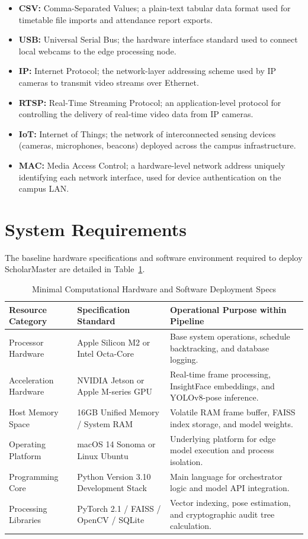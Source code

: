 \documentclass[12pt,a4paper,oneside]{report}
\begin{document}
\begin{itemize}
    \item \textbf{CSV:} Comma-Separated Values; a plain-text tabular data format used for timetable file imports and attendance report exports.
    \item \textbf{USB:} Universal Serial Bus; the hardware interface standard used to connect local webcams to the edge processing node.
    \item \textbf{IP:} Internet Protocol; the network-layer addressing scheme used by IP cameras to transmit video streams over Ethernet.
    \item \textbf{RTSP:} Real-Time Streaming Protocol; an application-level protocol for controlling the delivery of real-time video data from IP cameras.
    \item \textbf{IoT:} Internet of Things; the network of interconnected sensing devices (cameras, microphones, beacons) deployed across the campus infrastructure.
    \item \textbf{MAC:} Media Access Control; a hardware-level network address uniquely identifying each network interface, used for device authentication on the campus LAN.
\end{itemize}

\section{System Requirements}
The baseline hardware specifications and software environment required to deploy ScholarMaster are detailed in Table~\ref{tab:system_specs}.

\begin{table}[htbp]
\caption{Minimal Computational Hardware and Software Deployment Specs}
\centering
\small
{}
\begin{tabular}{@{}p{1.4in} p{1.5in} p{2.5in}@{}}
\hline
\textbf{Resource Category} & \textbf{Specification Standard} & \textbf{Operational Purpose within Pipeline} \\ \hline
Processor Hardware & Apple Silicon M2 or Intel Octa-Core & Base system operations, schedule backtracking, and database logging. \\ \hline
Acceleration Hardware & NVIDIA Jetson or Apple M-series GPU & Real-time frame processing, InsightFace embeddings, and YOLOv8-pose inference. \\ \hline
Host Memory Space & 16GB Unified Memory / System RAM & Volatile RAM frame buffer, FAISS index storage, and model weights. \\ \hline
Operating Platform & macOS 14 Sonoma or Linux Ubuntu & Underlying platform for edge model execution and process isolation. \\ \hline
Programming Core & Python Version 3.10 Development Stack & Main language for orchestrator logic and model API integration. \\ \hline
Processing Libraries & PyTorch 2.1 / FAISS / OpenCV / SQLite & Vector indexing, pose estimation, and cryptographic audit tree calculation. \\ \hline
\end{tabular}
\label{tab:system_specs}
\end{table}
\end{document}
